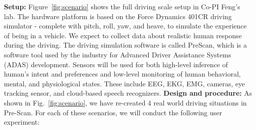 \noindent \textbf{Setup:}
Figure~\ref{fig:scenario} shows the full driving scale setup in Co-PI Feng's lab. 
The hardware platform is based on the Force Dynamics 401CR driving simulator - complete with pitch, roll, yaw, and heave, to simulate the experience of being in a vehicle. We expect to collect data about realistic human response during the driving. The driving simulation software is called PreScan, which is a software tool used by the industry for Advanced Driver Assistance Systems (ADAS) development. 
Sensors will be used for both high-level inference of human's intent and preferences and low-level monitoring of human behavioral, mental, and physiological states. These include EEG, EKG, EMG, cameras, eye tracking sensor, and cloud-based speech recognizers.
\newline
\noindent \textbf{Design and procedure:}
As shown in Fig.~\ref{fig:scenario}, we have re-created 4 real world driving situations in Pre-Scan.
For each of these scenarios, we will conduct the following user experiment:
